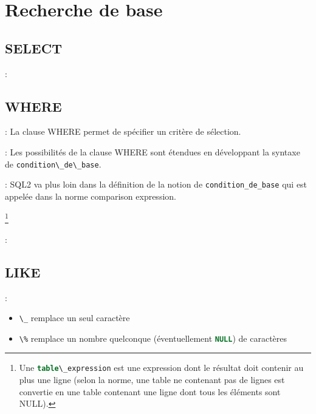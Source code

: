 \documentclass[10pt]{beamer}
\begin{document}
\section{Recherche de base}
\tocss
\subsection{SELECT}
\begin{frame}{\secname : \subsecname}
    
\end{frame}

\subsection{WHERE}
\begin{frame}{\secname : \subsecname}
    La clause WHERE permet de spécifier un critère de sélection.
    
\end{frame}

\begin{frame}{\secname : \subsecname}
    Les possibilités de la clause WHERE sont étendues en développant la syntaxe de \lstinline[language=bnf]!condition\_de\_base!.
    
\end{frame}

\begin{frame}{\secname : \subsecname}
    SQL2 va plus loin dans la définition de la notion de \lstinline[language=sql]!condition_de_base! qui est appelée dans la norme comparison expression.
    
    \footnote{Une \lstinline[language=sql]!table\_expression! est une expression dont le résultat doit contenir au plus une ligne (selon la norme, une table ne contenant pas de lignes est convertie en une table contenant une ligne dont tous les éléments sont NULL).}
\end{frame}

\begin{frame}{\secname : \subsecname}
    
\end{frame}

\subsection{LIKE}
\begin{frame}{\secname : \subsecname}
    
    \begin{itemize}
        \item \lstinline[language=sql]!\_! remplace un seul caractère
        \item \lstinline[language=sql]!\%! remplace un nombre quelconque (éventuellement \lstinline[language=sql]!NULL!) de caractères
    \end{itemize}
\end{frame}
\end{document}
